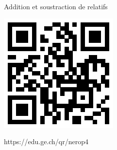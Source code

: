 \documentclass[a4paper,11pt]{report}
\begin{document}
\begin{qmun}{Addition et soustraction de relatifs}{
		\begin{center}
\includegraphics[scale=1]{media/qr/nerop4}

\tiny{{https://edu.ge.ch/qr/nerop4}}
		\end{center}
	}
\end{qmun}
\end{document}

